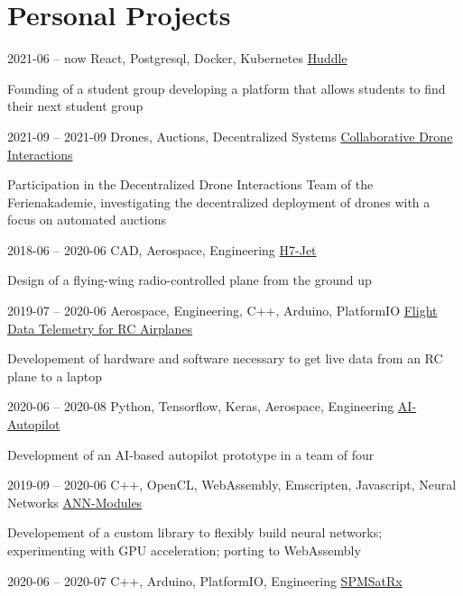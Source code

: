 \documentclass{tccv}
\begin{document}
\section{Personal Projects}
\begin{eventlist}
     

\item{ 2021-06 -- now }
	{ React, Postgresql, Docker, Kubernetes }
	{ \href{https://huddle.hsg.fs.tum.de}{Huddle} }

	Founding of a student group developing a platform that allows students to find their next student group 

\item{ 2021-09 -- 2021-09 }
	{ Drones, Auctions, Decentralized Systems }
	{ \href{https://ferienakademie.de}{Collaborative Drone Interactions} }

	Participation in the Decentralized Drone Interactions Team of the Ferienakademie, investigating the decentralized deployment of drones with a focus on automated auctions 

\item{ 2018-06 -- 2020-06 }
	{ CAD, Aerospace, Engineering }
	{ \href{https://www.instagram.com/h7_jet}{H7-Jet} }

	Design of a flying-wing radio-controlled plane from the ground up 

\item{ 2019-07 -- 2020-06 }
	{ Aerospace, Engineering, C++, Arduino, PlatformIO }
	{ \href{https://github.com/peteole?tab=projects}{Flight Data Telemetry for RC Airplanes} }

	Developement of hardware and software necessary to get live data from an RC plane to a laptop 

\item{ 2020-06 -- 2020-08 }
	{ Python, Tensorflow, Keras, Aerospace, Engineering }
	{ \href{https://github.com/fynsta/Intelliplane}{AI-Autopilot} }

	Development of an AI-based autopilot prototype in a team of four 

\item{ 2019-09 -- 2020-06 }
	{ C++, OpenCL, WebAssembly, Emscripten, Javascript, Neural Networks }
	{ \href{https://github.com/peteole/ann-modules}{ANN-Modules} }

	Developement of a custom library to flexibly build neural networks; experimenting with GPU acceleration; porting to WebAssembly 

\item{ 2020-06 -- 2020-07 }
	{ C++, Arduino, PlatformIO, Engineering }
	{ \href{https://github.com/peteole/SPMSatRx}{SPMSatRx} }


\end{eventlist}
\end{document}
